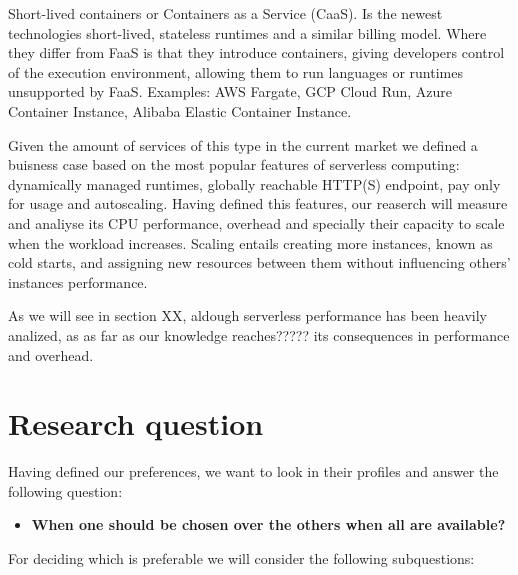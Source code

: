 \documentclass[11pt]{article}
\begin{document}
Short-lived containers or Containers as a Service (CaaS). Is the newest technologies short-lived, stateless runtimes and a similar billing model. Where they differ from FaaS is that they introduce containers, giving developers control of the execution environment, allowing them to run languages or runtimes unsupported by FaaS. Examples: AWS Fargate, GCP Cloud Run, Azure Container Instance, Alibaba Elastic Container Instance.

Given the amount of services of this type in the current market we defined a buisness case based on the most popular features \cite{popular1} of serverless computing: dynamically managed runtimes, globally reachable HTTP(S) endpoint, pay only for usage and autoscaling. Having defined this features, our reaserch will measure and analiyse its CPU performance, overhead and specially their capacity to scale when the workload increases. Scaling entails creating more instances, known as cold starts, and assigning new resources between them without influencing others' instances performance. 


As we will see in section XX, aldough serverless performance has been heavily analized, as as far as our knowledge reaches?????
 its consequences in performance and overhead.





\section{Research question}
Having defined our preferences, we want to look in their profiles and answer the following question:

\begin{itemize}
\item \textbf{When one should be chosen over the others when all are available?}
\end{itemize}

For deciding which is preferable we will consider the following subquestions:
\end{document}
